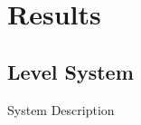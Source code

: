 
\section{Results}%
\label{sec:results}

\subsection{Level System}%
\label{subsec:level-system}

\begin{slide}{System Description}
  \vspace*{\fill}
  
  \vspace*{\fill}
\end{slide}

